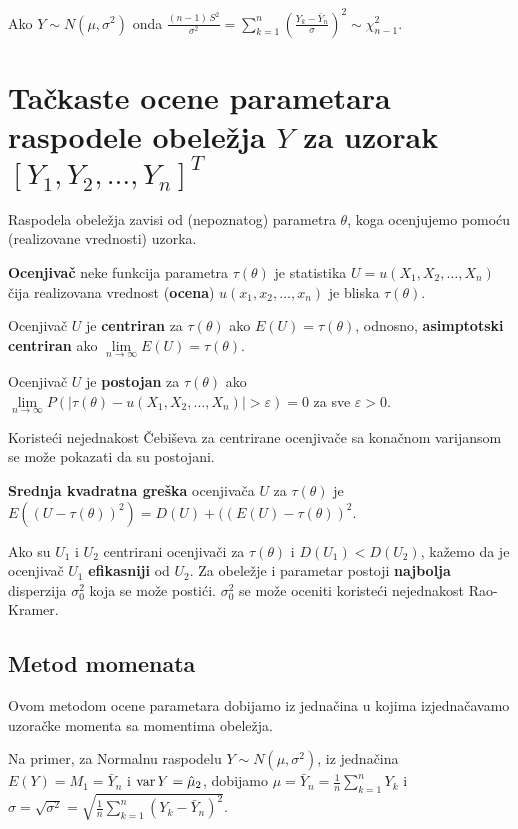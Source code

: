 \documentclass[twoside,titlepage,12pt,a4paper]{book}
\def\var{\mathop{\rm var}\nolimits}
\numberwithin{equation}{chapter}
\begin{document}
Ako $\displaystyle Y \sim N ( \mu, \sigma^2 )$ onda $\displaystyle \frac{( n - 1 ) \, S^2}{\sigma^2} = \sum_{k = 1}^n \left( \frac{Y_k - \bar{Y}_n}{\sigma} \right)^2 \sim \chi_{n - 1}^2$.


\section{Tačkaste ocene parametara raspodele obeležja $Y$ za uzorak $[Y_1, Y_2, \ldots, Y_n]^T$}

Raspodela obeležja zavisi od (nepoznatog) parametra $\theta$, koga ocenjujemo pomoću (realizovane vrednosti) uzorka.

\textbf{Ocenjivač} neke funkcija parametra $\tau ( \theta )$ je statistika $\displaystyle U = u ( X_1, X_2, \ldots, X_n )$ čija realizovana vrednost (\textbf{ocena}) $\displaystyle u ( x_1, x_2, \ldots, x_n )$ je bliska $\tau ( \theta )$.

Ocenjivač $U$ je \textbf{centriran} za $\tau ( \theta )$ ako 
$\displaystyle E ( U ) = \tau ( \theta )$, odnosno, \textbf{asimptotski centriran} ako
$\displaystyle \lim\limits_{n \rightarrow \infty} E ( U ) = \tau ( \theta )$.

Ocenjivač $U$ je \textbf{postojan} za $\tau ( \theta )$ ako 
$\displaystyle \lim\limits_{n \rightarrow \infty}
P ( | \tau ( \theta ) - u ( X_1, X_2, \ldots, X_n ) | > \varepsilon ) = 0$
za sve $\varepsilon > 0$.

Koristeći nejednakost Čebiševa za centrirane ocenjivače sa konačnom varijansom se može pokazati da su postojani.

\noindent\textbf{Srednja kvadratna greška} ocenjivača $U$ za $\tau ( \theta )$ je
\mbox{$E ( ( U - \tau (\theta ) )^2 ) =
D ( U ) + ( ( E ( U ) - \tau ( \theta ) )^2$.}

Ako su $U_1$ i $U_2$ centrirani ocenjivači za $\tau ( \theta )$
i $D ( U_1 ) < D ( U_2 )$, kažemo da je ocenjivač $U_1$
\textbf{efikasniji} od $U_2$. Za obeležje i parametar postoji
\textbf{najbolja} disperzija $\sigma_0^2$ koja se može postići.
$\sigma_0^2$ se može oceniti koristeći nejednakost Rao-Kramer.

\subsection{Metod momenata}

Ovom metodom ocene parametara dobijamo iz jednačina u kojima izjednačavamo 
uzoračke momenta sa momentima obeležja.

Na primer, za Normalnu raspodelu $Y \sim N ( \mu, \sigma^2 )$, iz jednačina
$E ( Y ) = M_1 = \bar{Y}_n$ i $\var Y = \hat{\mu}_2$, dobijamo
$\mu = \bar{Y}_n = \frac1n \sum_{k=1}^n Y_k$ i $\sigma = \sqrt{\sigma^2} = \sqrt{\frac1n \sum_{k=1}^n ( Y_k - \bar{Y}_n )^2}$.
\end{document}
